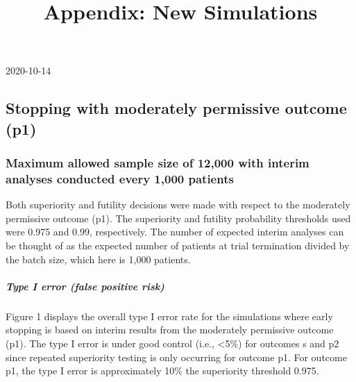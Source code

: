 \documentclass[]{article}
\title{Appendix: New Simulations}
\author{}
\date{\vspace{-2.5em}}
\let\oldsubparagraph\subparagraph
\renewcommand{\subparagraph}[1]{\oldsubparagraph{#1}\mbox{}}
\begin{document}
\maketitle

2020-10-14

\hypertarget{stopping-with-moderately-permissive-outcome-p1}{%
\subsection{Stopping with moderately permissive outcome
(p1)}\label{stopping-with-moderately-permissive-outcome-p1}}

\hypertarget{maximum-allowed-sample-size-of-12000-with-interim-analyses-conducted-every-1000-patients}{%
\subsubsection{Maximum allowed sample size of 12,000 with interim
analyses conducted every 1,000
patients}\label{maximum-allowed-sample-size-of-12000-with-interim-analyses-conducted-every-1000-patients}}

Both superiority and futility decisions were made with respect to the
moderately permissive outcome (p1). The superiority and futility
probability thresholds used were 0.975 and 0.99, respectively. The
number of expected interim analyses can be thought of as the expected
number of patients at trial termination divided by the batch size, which
here is 1,000 patients.

\hypertarget{type-i-error-false-positive-risk}{%
\subparagraph{Type I error (false positive
risk)}\label{type-i-error-false-positive-risk}}

Figure 1 displays the overall type I error rate for the simulations
where early stopping is based on interim results from the moderately
permissive outcome (p1). The type I error is under good control (i.e.,
\textless{}5\%) for outcomes s and p2 since repeated superiority testing
is only occurring for outcome p1. For outcome p1, the type I error is
approximately 10\% the superiority threshold 0.975.

\captionsetup[figure]{font=small,labelfont=small}
\end{document}
